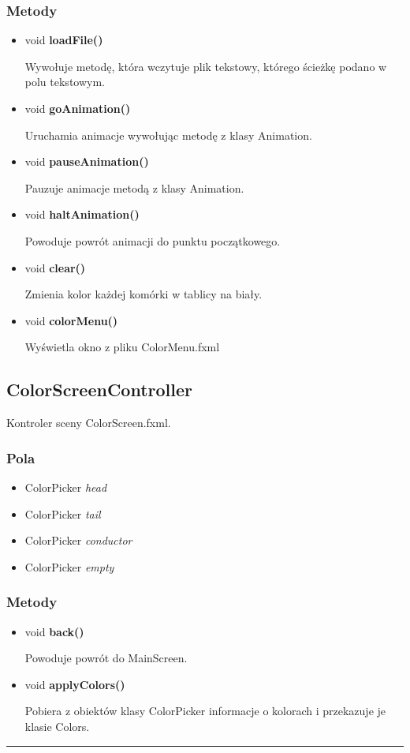 \documentclass[a4paper,11pt]{article}
\newcommand{\linia}{\rule{\linewidth}{0.4mm}}
\begin{document}
\subsubsection{Metody}
\begin{itemize}
\item void \textbf{loadFile()}

Wywołuje metodę, która wczytuje plik tekstowy, którego ścieżkę podano w polu tekstowym.
\item void \textbf{goAnimation()}

Uruchamia animacje wywołując metodę z klasy Animation.
\item void \textbf{pauseAnimation()}

Pauzuje animacje metodą z klasy Animation.
\item void \textbf{haltAnimation()}

Powoduje powrót animacji do punktu początkowego.
\item void \textbf{clear()}

Zmienia kolor każdej komórki w tablicy na biały.
\item void \textbf{colorMenu()}

Wyświetla okno z pliku ColorMenu.fxml
\end{itemize}





\subsection{ColorScreenController}
Kontroler sceny ColorScreen.fxml.
\subsubsection{Pola}
\begin{itemize}
\item ColorPicker \textit{head}
\item ColorPicker \textit{tail}
\item ColorPicker \textit{conductor}
\item ColorPicker \textit{empty}

\end{itemize}
\subsubsection{Metody}
\begin{itemize}
\item void \textbf{back()}

Powoduje powrót do MainScreen.
\item void \textbf{applyColors()}

Pobiera z obiektów klasy ColorPicker informacje o kolorach i przekazuje je klasie Colors.

\end{itemize}
\noindent\linia
\end{document}
